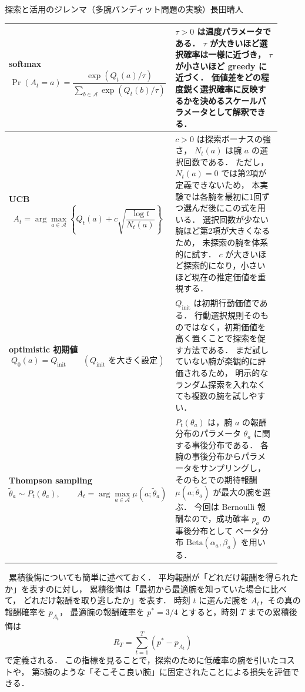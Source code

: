 \begin{column}{探索と活用のジレンマ（多腕バンディット問題の実験）}{長田晴人}
\begin{center}
\begin{tabular}{p{0.42\linewidth}p{0.50\linewidth}}
      \midrule

      \textbf{softmax}
      \[
      \Pr(A_t=a)
      =
      \frac{\exp(Q_t(a)/\tau)}
      {\sum_{b\in\mathcal{A}}\exp(Q_t(b)/\tau)}
      \]
      &
      $\tau>0$ は温度パラメータである．
      $\tau$ が大きいほど選択確率は一様に近づき，
      $\tau$ が小さいほど greedy に近づく．
      価値差をどの程度鋭く選択確率に反映するかを決めるスケールパラメータとして解釈できる．
      \\

      \midrule

      \textbf{UCB}
      \[
      A_t
      =
      \arg\max_{a\in\mathcal{A}}
      \left\{
      Q_t(a)
      +
      c\sqrt{\frac{\log t}{N_t(a)}}
      \right\}
      \]
      &
      $c>0$ は探索ボーナスの強さ，
      $N_t(a)$ は腕 $a$ の選択回数である．
      ただし，$N_t(a)=0$ では第2項が定義できないため，
      本実験では各腕を最初に1回ずつ選んだ後にこの式を用いる．
      選択回数が少ない腕ほど第2項が大きくなるため，
      未探索の腕を体系的に試す．
      $c$ が大きいほど探索的になり，小さいほど現在の推定価値を重視する．
      \\

      \midrule

      \textbf{optimistic 初期値}
      \[
      Q_0(a)=Q_{\mathrm{init}}
      \qquad
      (Q_{\mathrm{init}}\text{ を大きく設定})
      \]
      &
      $Q_{\mathrm{init}}$ は初期行動価値である．
      行動選択規則そのものではなく，初期価値を高く置くことで探索を促す方法である．
      まだ試していない腕が楽観的に評価されるため，
      明示的なランダム探索を入れなくても複数の腕を試しやすい．
      \\

      \midrule

      \textbf{Thompson sampling}
      \[
      \tilde{\theta}_a \sim P_t(\theta_a),
      \qquad
      A_t=\arg\max_{a\in\mathcal{A}}\mu(a;\tilde{\theta}_a)
      \]
      &
      $P_t(\theta_a)$ は，腕 $a$ の報酬分布のパラメータ $\theta_a$ に関する事後分布である．
      各腕の事後分布からパラメータをサンプリングし，
      そのもとでの期待報酬 $\mu(a;\tilde{\theta}_a)$ が最大の腕を選ぶ．
      今回は Bernoulli 報酬なので，成功確率 $p_a$ の事後分布として
      ベータ分布 $\mathrm{Beta}(\alpha_a,\beta_a)$ を用いる．
      \\

      \bottomrule
    \end{tabular}
\end{center}

\ 累積後悔についても簡単に述べておく．
平均報酬が「どれだけ報酬を得られたか」を表すのに対し，
累積後悔は「最初から最適腕を知っていた場合に比べて，
どれだけ報酬を取り逃したか」を表す．
時刻 $t$ に選んだ腕を $A_t$，その真の報酬確率を $p_{A_t}$，
最適腕の報酬確率を $p^\ast=3/4$ とすると，時刻 $T$ までの累積後悔は
\[
    R_T=\sum_{t=1}^{T}\left(p^\ast-p_{A_t}\right)
\]
で定義される．
この指標を見ることで，探索のために低確率の腕を引いたコストや，
第5腕のような「そこそこ良い腕」に固定されたことによる損失を評価できる．


\end{column}
